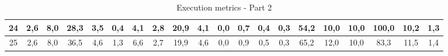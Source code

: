 \begin{sidewaystable}[]
\begin{tabular}{|c|c|c|c|c|c|c|c|c|c|c|c|c|c|c|c|c|c|c|c|}
    24 & 2,6                                              & 8,0                                              & 28,3                                             & 3,5                                              & 0,4                                              & 4,1                                              & 2,8                                              & 20,9                                             & 4,1                                              & 0,0                                              & 0,7                                              & 0,4                                              & 0,3                                              & 54,2                                            & 10,0                                            & 10,0                                            & 100,0                                           & 10,2                                            & 1,3                                             \\ \hline
    25 & 2,6                                              & 8,0                                              & 36,5                                             & 4,6                                              & 1,3                                              & 6,6                                              & 2,7                                              & 19,9                                             & 4,6                                              & 0,0                                              & 0,9                                              & 0,5                                              & 0,3                                              & 65,2                                            & 12,0                                            & 10,0                                            & 83,3                                            & 11,5                                            & 1,4                                             \\ \hline
    \end{tabular}
    \caption{Execution metrics - Part 2}
    \label{tab:ap:exec_metrics_2}
\end{sidewaystable}


